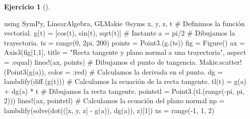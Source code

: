 \documentclass[
  a4paper,
]{scrreport}
\newenvironment{Shaded}{\begin{snugshade}}{\end{snugshade}}
\newcommand{\BuiltInTok}[1]{\textcolor[rgb]{0.00,0.23,0.31}{#1}}
\newcommand{\CommentTok}[1]{\textcolor[rgb]{0.37,0.37,0.37}{#1}}
\newcommand{\ConstantTok}[1]{\textcolor[rgb]{0.56,0.35,0.01}{#1}}
\newcommand{\FloatTok}[1]{\textcolor[rgb]{0.68,0.00,0.00}{#1}}
\newcommand{\FunctionTok}[1]{\textcolor[rgb]{0.28,0.35,0.67}{#1}}
\newcommand{\ImportTok}[1]{\textcolor[rgb]{0.00,0.46,0.62}{#1}}
\newcommand{\NormalTok}[1]{\textcolor[rgb]{0.00,0.23,0.31}{#1}}
\newcommand{\OperatorTok}[1]{\textcolor[rgb]{0.37,0.37,0.37}{#1}}
\newcommand{\PreprocessorTok}[1]{\textcolor[rgb]{0.68,0.00,0.00}{#1}}
\newcommand{\StringTok}[1]{\textcolor[rgb]{0.13,0.47,0.30}{#1}}
\theoremstyle{definition}
\newtheorem{exercise}{Ejercicio}[chapter]
\theoremstyle{remark}
\begin{document}
\begin{exercise}[]
\begin{enumerate}
\begin{tcolorbox}
\begin{Shaded}
\begin{Highlighting}[]
\ImportTok{using} \BuiltInTok{SymPy}\NormalTok{, }\BuiltInTok{LinearAlgebra}\NormalTok{, }\BuiltInTok{GLMakie}
\PreprocessorTok{@syms}\NormalTok{ x, y, z, t}
\CommentTok{\# Definimos la función vectorial.}
\FunctionTok{g}\NormalTok{(t) }\OperatorTok{=}\NormalTok{ [}\FunctionTok{cos}\NormalTok{(t), }\FunctionTok{sin}\NormalTok{(t), }\FunctionTok{sqrt}\NormalTok{(t)]}
\CommentTok{\# Instante }
\NormalTok{a }\OperatorTok{=} \ConstantTok{pi}\OperatorTok{/}\FloatTok{2}
\CommentTok{\# Dibujamos la trayectoria.}
\NormalTok{ts }\OperatorTok{=} \FunctionTok{range}\NormalTok{(}\FloatTok{0}\NormalTok{, }\FloatTok{2}\NormalTok{pi, }\FloatTok{200}\NormalTok{)}
\NormalTok{points }\OperatorTok{=} \FunctionTok{Point3}\NormalTok{.(}\FunctionTok{g}\NormalTok{.(ts))}
\NormalTok{fig }\OperatorTok{=} \FunctionTok{Figure}\NormalTok{()}
\NormalTok{ax }\OperatorTok{=} \FunctionTok{Axis3}\NormalTok{(fig[}\FloatTok{1}\NormalTok{,}\FloatTok{1}\NormalTok{], title }\OperatorTok{=} \StringTok{"Recta tangente y plano normal a una trayectoria"}\NormalTok{, aspect }\OperatorTok{=} \OperatorTok{:}\NormalTok{equal)}
\FunctionTok{lines!}\NormalTok{(ax, points)}
\CommentTok{\# Dibujamos el punto de tangencia.}
\NormalTok{Makie.}\FunctionTok{scatter!}\NormalTok{(}\FunctionTok{Point3}\NormalTok{(}\FunctionTok{g}\NormalTok{(a)), color }\OperatorTok{=} \OperatorTok{:}\NormalTok{red)}
\CommentTok{\# Calculamos la derivada en el punto.}
\NormalTok{dg }\OperatorTok{=} \FunctionTok{lambdify}\NormalTok{(}\FunctionTok{diff}\NormalTok{.(}\FunctionTok{g}\NormalTok{(t)))}
\CommentTok{\# Calculamos la ecuación de la recta tangente.}
\FunctionTok{tl}\NormalTok{(t) }\OperatorTok{=} \FunctionTok{g}\NormalTok{(a) }\OperatorTok{+} \FunctionTok{dg}\NormalTok{(a) }\OperatorTok{*}\NormalTok{ t}
\CommentTok{\# Dibujamos la recta tangente.}
\NormalTok{pointstl }\OperatorTok{=} \FunctionTok{Point3}\NormalTok{.(}\FunctionTok{tl}\NormalTok{.(}\FunctionTok{range}\NormalTok{(}\OperatorTok{{-}}\ConstantTok{pi}\NormalTok{, }\ConstantTok{pi}\NormalTok{, }\FloatTok{2}\NormalTok{)))}
\FunctionTok{lines!}\NormalTok{(ax, pointstl)}
\CommentTok{\# Calculamos la ecuación del plano normal}
\NormalTok{np }\OperatorTok{=} \FunctionTok{lambdify}\NormalTok{(}\FunctionTok{solve}\NormalTok{(}\FunctionTok{dot}\NormalTok{(([x, y, z] }\OperatorTok{{-}} \FunctionTok{g}\NormalTok{(a)), }\FunctionTok{dg}\NormalTok{(a)), z)[}\FloatTok{1}\NormalTok{])}
\NormalTok{xs }\OperatorTok{=} \FunctionTok{range}\NormalTok{(}\OperatorTok{{-}}\FloatTok{1}\NormalTok{, }\FloatTok{1}\NormalTok{, }\FloatTok{2}\NormalTok{)}

\end{Highlighting}
\end{Shaded}
\end{tcolorbox}
\end{enumerate}
\end{exercise}
\end{document}
